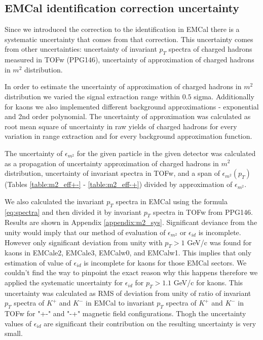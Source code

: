 \subsection{EMCal identification correction uncertainty}
\label{sec:emcal_id_uncertainty}

Since we introduced the correction to the identification in EMCal there is a systematic uncertainty that comes from that correction. This uncertainty comes from other uncertainties: uncertainty of invariant $p_T$ spectra of charged hadrons measured in TOFw (PPG146), uncertainty of approximation of charged hadrons in $m^2$ distribution.

In order to estimate the uncertainty of approximation of charged hadrons in $m^2$ distribution we varied the signal extraction range within $0.5$ sigma. Additionally for kaons we also implemented different background approximations - exponential and 2nd order polynomial. The uncertainty of approximation was calculated as root mean square of uncertainty in raw yields of charged hadrons for every variation in range extraction and for every background approximation function.

	The uncertainty of $\epsilon_{m^2}$ for the given particle in the given detector was calculated as a propagation of uncertainty approximation of charged hadrons in $m^2$ distribution, uncertainty of invariant spectra in TOFw, and a span of $\epsilon_{m^2}(p_T)$ (Tables \ref{table:m2_eff+-} - \ref{table:m2_eff-+}) divided by approximation of $\epsilon_{m^2}$.

We also calculated the invariant $p_T$ spectra in EMCal using the formula \ref{eq:spectra} and then divided it by invariant $p_T$ spectra in TOFw from PPG146. Results are shown in Appendix \ref{appendix:m2_sys}. Significant deviance from the unity would imply that our method of evaluation of $\epsilon_{m^2}$ or $\epsilon_{id}$ is incomplete. However only significant deviation from unity with $p_T > 1$ GeV/c was found for kaons in EMCale2, EMCale3, EMCalw0, and EMCalw1. This implies that only estimation of value of $\epsilon_{id}$ is incomplete for kaons for those EMCal sectors. We couldn't find the way to pinpoint the exact reason why this happens therefore we applied the systematic uncertainty for $\epsilon_{id}$ for $p_T > 1.1$ GeV/c for kaons. This uncertainty was calculated as RMS of deviation from unity of ratio of invariant $p_T$ spectra of $K^+$ and $K^-$ in EMCal to invariant $p_T$ spectra of $K^+$ and $K^-$ in TOFw for "+-" and "-+" magnetic field configurations. Thogh the uncertainty values of $\epsilon_{id}$ are significant their contribution on the resulting uncertainty is very small.

